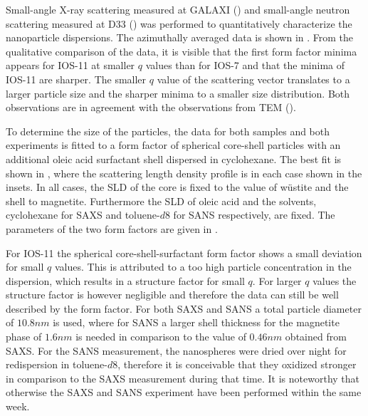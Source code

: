 \documentclass[\main/dresen_thesis.tex]{subfiles}
\begin{document}
  \label{sec:looselyPackedNS:nanoparticle:sas}
  Small-angle X-ray scattering measured at GALAXI () and small-angle neutron scattering measured at D33 () was performed to quantitatively characterize the nanoparticle dispersions.
  The azimuthally averaged data is shown in .
  From the qualitative comparison of the data, it is visible that the first form factor minima appears for IOS-11 at smaller $q$ values than for IOS-7 and that the minima of IOS-11 are sharper.
  The smaller $q$ value of the scattering vector translates to a larger particle size and the sharper minima to a smaller size distribution.
  Both observations are in agreement with the observations from TEM ().


    To determine the size of the particles, the data for both samples and both experiments is fitted to a form factor of spherical core-shell particles with an additional oleic acid surfactant shell dispersed in cyclohexane.
    The best fit is shown in , where the scattering length density profile is in each case shown in the insets.
    In all cases, the SLD of the core is fixed to the value of w\"ustite and the shell to magnetite.
    Furthermore the SLD of oleic acid and the solvents, cyclohexane for SAXS and toluene-$\mathit{d8}$ for SANS respectively, are fixed.
    The parameters of the two form factors are given in .

    For IOS-11 the spherical core-shell-surfactant form factor shows a small deviation for small $q$ values.
    This is attributed to a too high particle concentration in the dispersion, which results in a structure factor for small $q$.
    For larger $q$ values the structure factor is however negligible and therefore the data can still be well described by the form factor.
    For both SAXS and SANS a total particle diameter of $10.8 \unit{nm}$ is used, where for SANS a larger shell thickness for the magnetite phase of $1.6 \unit{nm}$ is needed in comparison to the value of $0.46 \unit{nm}$ obtained from SAXS.
    For the SANS measurement, the nanospheres were dried over night for redispersion in toluene-$\mathit{d8}$, therefore it is conceivable that they oxidized stronger in comparison to the SAXS measurement during that time.
    It is noteworthy that otherwise the SAXS and SANS experiment have been performed within the same week.
\end{document}
